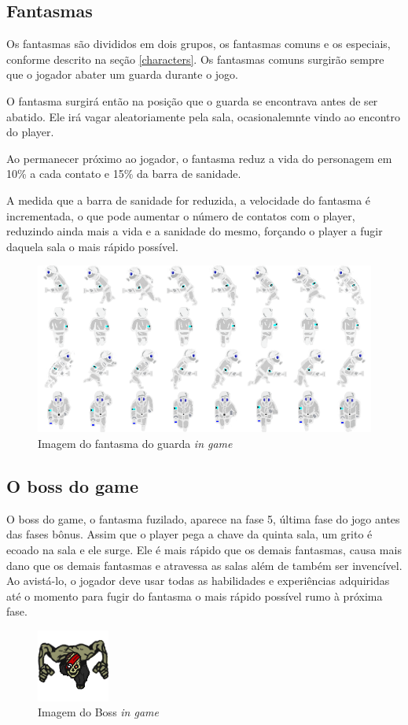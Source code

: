 \subsection{Fantasmas}
Os fantasmas são divididos em dois grupos, os fantasmas comuns e os especiais, conforme descrito na seção \ref{characters}. Os fantasmas comuns surgirão sempre que o jogador abater um guarda durante o jogo. 

O fantasma surgirá então na posição que o guarda se encontrava antes de ser abatido. Ele irá vagar aleatoriamente pela sala, ocasionalemnte vindo ao encontro do player. 

Ao permanecer próximo ao jogador, o fantasma reduz a vida do personagem em 10\% a cada contato e 15\% da barra de sanidade.

A medida que a barra de sanidade for reduzida, a velocidade do fantasma é incrementada, o que pode aumentar o número de contatos com o player, reduzindo ainda mais a vida e a sanidade do mesmo, forçando o player a fugir daquela sala o mais rápido possível.

\begin{figure}[h]
    \centering
    \caption{Imagem do fantasma do guarda \textit{in game}}
     \includegraphics[keepaspectratio=true,scale=2]{images/ghostGuarda.png}
\end{figure}

\subsection{O boss do game}
O boss do game, o fantasma fuzilado, aparece na fase 5, última fase do jogo antes das fases bônus. Assim que o player pega a chave da quinta sala, um grito é ecoado na sala e ele surge. Ele é mais rápido que os demais fantasmas, causa mais dano que os demais fantasmas e atravessa as salas além de também ser invencível. Ao avistá-lo, o jogador deve usar todas as habilidades e experiências adquiridas até o momento para fugir do fantasma o mais rápido possível rumo à próxima fase.
\begin{figure}[h]
    \centering
    \caption{Imagem do Boss \textit{in game}}
     \includegraphics[keepaspectratio=true,scale=6]{images/bossf4.png}
\end{figure}

